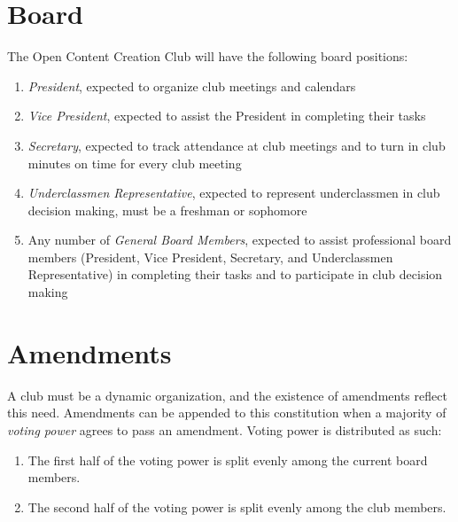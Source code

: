 \documentclass[10pt,letterpaper]{article}
\begin{document}
	\section{Board}
	The Open Content Creation Club will have the following board positions:
	\begin{enumerate}[label=(\alph*)]
		\item \emph{President}, expected to organize club meetings and calendars
		\item \emph{Vice President}, expected to assist the President in completing their tasks
		\item \emph{Secretary}, expected to track attendance at club meetings and to turn in club minutes on time for every club meeting
		\item \emph{Underclassmen Representative}, expected to represent underclassmen in club decision making, must be a freshman or sophomore
		\item Any number of \emph{General Board Members}, expected to assist professional board members (President, Vice President, Secretary, and Underclassmen Representative) in completing their tasks and to participate in club decision making
	\end{enumerate}
	
	\section{Amendments}
	A club must be a dynamic organization, and the existence of amendments reflect this need.
	Amendments can be appended to this constitution when a majority of \emph{voting power} agrees to pass an amendment.
	Voting power is distributed as such:
	\begin{enumerate}[label=(\alph*)]
		\item The first half of the voting power is split evenly among the current board members.
		\item The second half of the voting power is split evenly among the club members.
	\end{enumerate}
	
\end{document}
